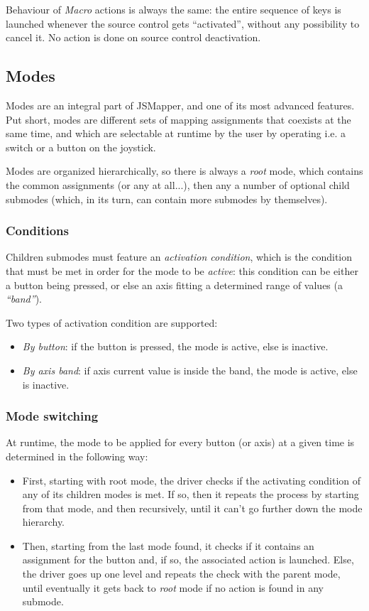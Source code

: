 Behaviour of \emph{Macro} actions is always the same: the entire sequence of keys is launched whenever the source control gets ``activated'', without any possibility to cancel it. No action is done on source control deactivation.


\subsection{Modes}
Modes are an integral part of JSMapper, and one of its most advanced features. Put short, modes are different sets of mapping assignments that coexists at the same time, and which are selectable at runtime by the user by operating i.e. a switch or a button on the joystick.

Modes are organized hierarchically, so there is always a \emph{root} mode, which contains the common assignments (or any at all...), then any a number of optional child submodes (which, in its turn, can contain more submodes by themselves).

\subsubsection{Conditions}
Children submodes must feature an \emph{activation condition}, which is the condition that must be met in order for the mode to be \emph{active}: this condition can be either a button being pressed, or else an axis fitting a determined range of values (a \emph{``band''}).

Two types of activation condition are supported:
\begin{itemize}
	\item \emph{By button}: if the button is pressed, the mode is active, else is inactive.
	\item \emph{By axis band}: if axis current value is inside the band, the mode is active, else is inactive.
\end{itemize}

\subsubsection{Mode switching}
At runtime, the mode to be applied for every button (or axis) at a given time is determined in the following way:
\begin{itemize}
 \item First, starting with root mode, the driver checks if the activating condition of any of its children modes is met. If so, then it repeats the process by starting from that mode, and then recursively, until it can't go further down the mode hierarchy.
 \item Then, starting from the last mode found, it checks if it contains an assignment for the button and, if so, the associated action is launched. Else, the driver goes up one level and repeats the check with the parent mode, until eventually it gets back to \emph{root} mode if no action is found in any submode.
\end{itemize} 


